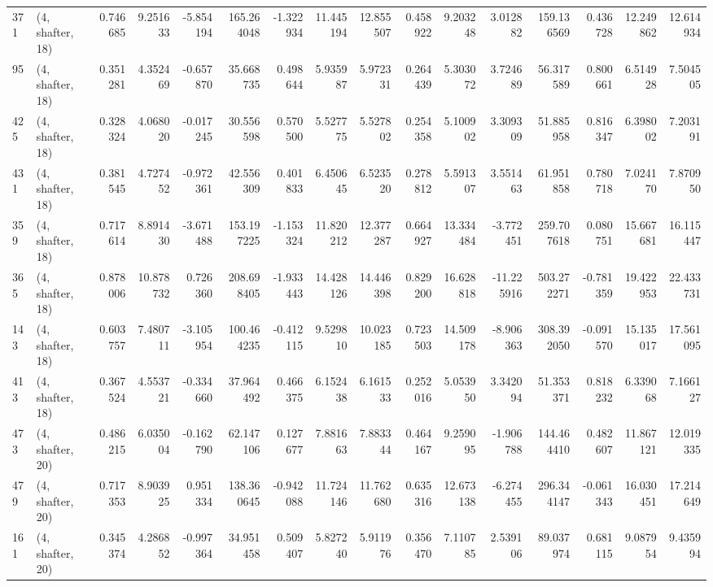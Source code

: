 \begin{tabular}{llrrrrrrrrrrrrrr}
371 &  (4, shafter, 18) &   0.746685 &   9.251633 &  -5.854194 &   165.264048 &  -1.322934 &  11.445194 &  12.855507 &  0.458922 &   9.203248 &   3.012882 &   159.136569 &   0.436728 &  12.249862 &  12.614934 \\
95  &  (4, shafter, 18) &   0.351281 &   4.352469 &  -0.657870 &    35.668735 &   0.498644 &   5.935987 &   5.972331 &  0.264439 &   5.303072 &   3.724689 &    56.317589 &   0.800661 &   6.514928 &   7.504505 \\
425 &  (4, shafter, 18) &   0.328324 &   4.068020 &  -0.017245 &    30.556598 &   0.570500 &   5.527775 &   5.527802 &  0.254358 &   5.100902 &   3.309309 &    51.885958 &   0.816347 &   6.398002 &   7.203191 \\
431 &  (4, shafter, 18) &   0.381545 &   4.727452 &  -0.972361 &    42.556309 &   0.401833 &   6.450645 &   6.523520 &  0.278812 &   5.591307 &   3.551463 &    61.951858 &   0.780718 &   7.024170 &   7.870950 \\
359 &  (4, shafter, 18) &   0.717614 &   8.891430 &  -3.671488 &   153.197225 &  -1.153324 &  11.820212 &  12.377287 &  0.664927 &  13.334484 &  -3.772451 &   259.707618 &   0.080751 &  15.667681 &  16.115447 \\
365 &  (4, shafter, 18) &   0.878006 &  10.878732 &   0.726360 &   208.698405 &  -1.933443 &  14.428126 &  14.446398 &  0.829200 &  16.628818 & -11.225916 &   503.272271 &  -0.781359 &  19.422953 &  22.433731 \\
143 &  (4, shafter, 18) &   0.603757 &   7.480711 &  -3.105954 &   100.464235 &  -0.412115 &   9.529810 &  10.023185 &  0.723503 &  14.509178 &  -8.906363 &   308.392050 &  -0.091570 &  15.135017 &  17.561095 \\
413 &  (4, shafter, 18) &   0.367524 &   4.553721 &  -0.334660 &    37.964492 &   0.466375 &   6.152438 &   6.161533 &  0.252016 &   5.053950 &   3.342094 &    51.353371 &   0.818232 &   6.339068 &   7.166127 \\
473 &  (4, shafter, 20) &   0.486215 &   6.035004 &  -0.162790 &    62.147106 &   0.127677 &   7.881663 &   7.883344 &  0.464167 &   9.259095 &  -1.906788 &   144.464410 &   0.482607 &  11.867121 &  12.019335 \\
479 &  (4, shafter, 20) &   0.717353 &   8.903925 &   0.951334 &   138.360645 &  -0.942088 &  11.724146 &  11.762680 &  0.635316 &  12.673138 &  -6.274455 &   296.344147 &  -0.061343 &  16.030451 &  17.214649 \\
161 &  (4, shafter, 20) &   0.345374 &   4.286852 &  -0.997364 &    34.951458 &   0.509407 &   5.827240 &   5.911976 &  0.356470 &   7.110785 &   2.539106 &    89.037974 &   0.681115 &   9.087954 &   9.435994 \\

\end{tabular}
